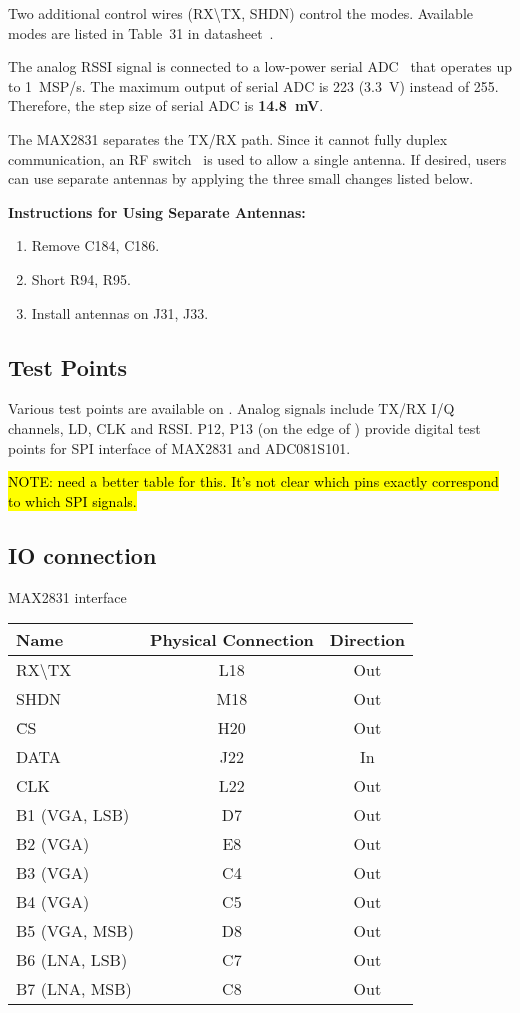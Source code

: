 Two additional control wires (RX\textbackslash{}TX, SHDN) control the modes. Available
modes are listed in Table~31 in datasheet~\cite{MAX2831}.

The analog RSSI signal is connected to a low-power serial ADC~\cite{ADC081S101} that operates up to 1~MSP/s.
The maximum output of serial ADC is 223 (3.3~V) instead of 255. Therefore, the step size
of serial ADC is {\bf 14.8~mV}.

The MAX2831 separates the TX/RX path. Since it cannot fully duplex communication, an
RF switch~\cite{AS213} is used to allow a single antenna. If desired, users can
use separate antennas by applying the three small changes listed below.

{\bf Instructions for Using Separate Antennas:}
\begin{enumerate}[noitemsep]
	\item Remove C184, C186.
	\item Short R94, R95.
	\item Install antennas on J31, J33.
\end{enumerate}

\subsection{Test Points}
Various test points are available on \sdr. Analog signals include TX/RX I/Q channels, LD, CLK and RSSI.
P12, P13 (on the edge of \sdr) provide digital test points for SPI interface of MAX2831 and
ADC081S101.

\hl{NOTE: need a better table for this. It's not clear which pins exactly
correspond to which SPI signals.}

\subsection{IO connection}
MAX2831 interface
\begin{table}[h]
\centering
\begin{tabular}{|l|c|c|}
	\hline
	{\bf Name} & {\bf Physical Connection} & {\bf Direction}\\ \hline
	RX\textbackslash{}TX 	& L18 & Out\\ \hline
	SHDN 	& M18 & Out\\ \hline\hline
	\={CS}	& H20 & Out\\ \hline
	DATA	& J22 & In\\ \hline
	CLK		& L22 & Out\\ \hline\hline
	B1 (VGA, LSB) 	& D7 & Out\\ \hline
	B2 (VGA)		& E8 & Out\\ \hline
	B3 (VGA)		& C4 & Out\\ \hline
	B4 (VGA)		& C5 & Out\\ \hline
	B5 (VGA, MSB)	& D8 & Out\\ \hline
	B6 (LNA, LSB)	& C7 & Out\\ \hline
	B7 (LNA, MSB)	& C8 & Out\\ \hline
\end{tabular}
\end{table}

